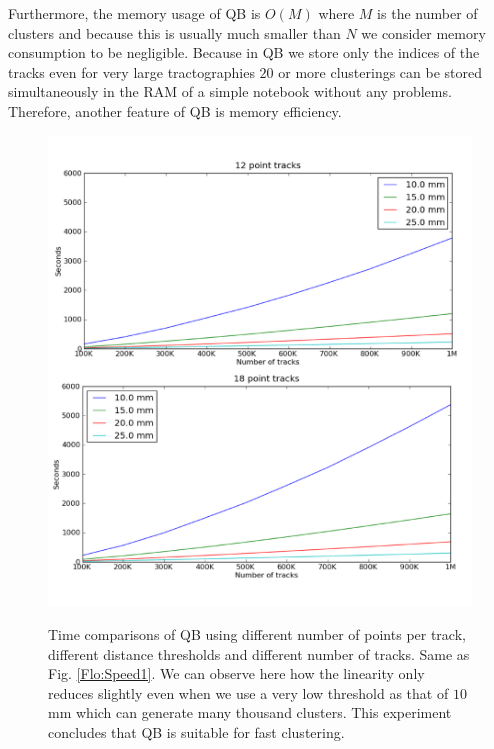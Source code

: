 \documentclass[preprint,authoryear,a4paper,10pt,onecolumn]{elsarticle}
\begin{document}
Furthermore, the memory usage of QB is $O(M)$ where $M$ is the number
of clusters and because this is usually much smaller than $N$ we
consider memory consumption to be negligible. Because in QB we store
only the indices of the tracks even for very large tractographies
$20$ or more clusterings can be stored simultaneously in the RAM
of a simple notebook without any problems. Therefore, another feature
of QB is memory efficiency.

%
\begin{figure}
\noindent \begin{centering}
\label{Flo:Speed2}\includegraphics[scale=0.8]{last_figures/speed_12_18}
\par\end{centering}

\caption{Time comparisons of QB using different number of points per track,
different distance thresholds and different number of tracks. Same
as Fig. \ref{Flo:Speed1}. We can observe here how the linearity only
reduces slightly even when we use a very low threshold as that of
$10$mm which can generate many thousand clusters. This experiment
concludes that QB is suitable for fast clustering.}

\end{figure}
\end{document}
